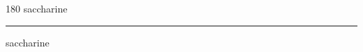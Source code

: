 
\begin{frame}
\begin{center}
\begin{turn}{180}
{\fontsize{2.5cm}{1em}\selectfont saccharine}
\end{turn}
\vspace{1em}\par  
\hrule
\vspace{1em}\par  
{\fontsize{2.5cm}{1em}\selectfont saccharine}
\end{center}
\end{frame}
